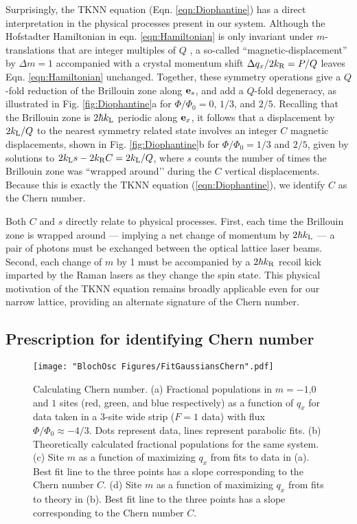 Surprisingly, the TKNN equation (Eqn. \ref{eqn:Diophantine}) has a direct interpretation in the physical processes present in our system.  Although the Hofstadter Hamiltonian in eqn. \ref{eqn:Hamiltonian} is only invariant under $m$-translations that are integer multiples of $Q$ , a so-called ``magnetic-displacement'' by $\Delta m=1$ accompanied with a crystal momentum shift $\Delta q_x/2 k_{\rm R} = P/Q$ leaves Eqn. \ref{eqn:Hamiltonian} unchanged.  Together, these symmetry operations give a $Q$-fold reduction of the Brillouin zone along ${\bf e}_s$, and add a $Q$-fold degeneracy, as illustrated in Fig. \ref{fig:Diophantine}a  for $\Phi/\Phi_0=0$, $1/3$, and $2/5$.  Recalling that the Brillouin zone is $2 \hbar k_{\rm L}$ periodic along ${\bf e}_x$, it follows that a displacement by $2 k_{\rm L}/Q$ to the nearest symmetry related state involves an integer $C$ magnetic displacements, shown in Fig. \ref{fig:Diophantine}b for $\Phi/\Phi_0=1/3$ and $2/5$, given by solutions to $2  k_{\rm L} s - 2  k_{\rm R} C = 2  k_{\rm L}/Q$, where $s$ counts the number of times the Brillouin zone was ``wrapped around’’ during the $C$ vertical displacements. Because this is exactly the TKNN equation (\ref{eqn:Diophantine}), we identify $C$ as the Chern number. 

Both $C$ and $s$ directly relate to physical processes.  First, each time the  Brillouin zone is wrapped around — implying a net change of momentum by $2 \hbar k_{\rm L}$ — a pair of photons must be exchanged between the optical lattice laser beams.  Second, each change of $m$ by 1 must be accompanied by a $2 \hbar k_{\rm R}$ recoil kick imparted by the Raman lasers as they change the spin state.  This physical motivation of the TKNN equation remains broadly applicable even for our narrow lattice, providing an alternate signature of the Chern number.

\subsection{Prescription for identifying Chern number}

\begin{figure}
\texttt{[image: "BlochOsc Figures/FitGaussiansChern".pdf]}
\caption[Calculating Chern number]{Calculating Chern number. (a) Fractional populations in $m=-1$,$0$ and $1$ sites (red, green, and blue respectively) as a function of $q_x$ for data taken in a $3$-site wide strip ($F=1$ data) with flux $\Phi/\Phi_0\approx-4/3$. Dots represent data, lines represent parabolic fits. (b) Theoretically calculated fractional populations for the same system. (c) Site $m$ as a function of maximizing $q_x$ from fits to data in (a). Best fit line to the three points has a slope corresponding to the Chern number $C$. (d) Site $m$ as a function of maximizing $q_x$ from fits to theory in (b). Best fit line to the three points has a slope corresponding to the Chern number $C$.  }
\label{fig:FitGaussiansChern}
\end{figure}

